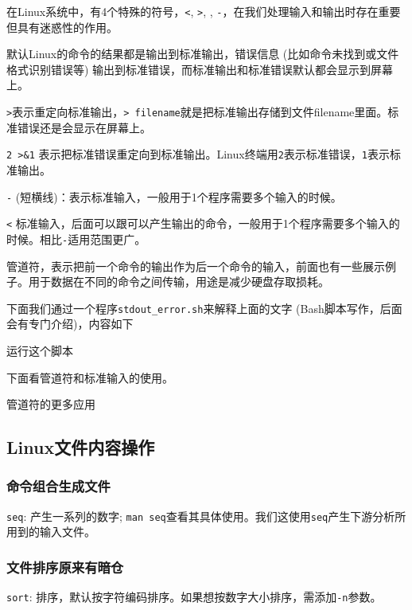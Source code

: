 \documentclass[]{article}
\numberwithin{figure}{section}
\numberwithin{table}{section}
\begin{document}
在Linux系统中，有4个特殊的符号，\texttt{\textless{}}, \texttt{\textgreater{}}, \texttt{\textbar{}}, \texttt{-}，在我们处理输入和输出时存在重要但具有迷惑性的作用。

默认Linux的命令的结果都是输出到标准输出，错误信息 (比如命令未找到或文件格式识别错误等) 输出到标准错误，而标准输出和标准错误默认都会显示到屏幕上。

\texttt{\textgreater{}}表示重定向标准输出，\texttt{\textgreater{}\ filename}就是把标准输出存储到文件filename里面。标准错误还是会显示在屏幕上。

\texttt{2\ \textgreater{}\&1} 表示把标准错误重定向到标准输出。Linux终端用\texttt{2}表示标准错误，\texttt{1}表示标准输出。

\texttt{-} (短横线)：表示标准输入，一般用于1个程序需要多个输入的时候。

\texttt{\textless{}} 标准输入，后面可以跟可以产生输出的命令，一般用于1个程序需要多个输入的时候。相比\texttt{-}适用范围更广。

\texttt{\textbar{}}管道符，表示把前一个命令的输出作为后一个命令的输入，前面也有一些展示例子。用于数据在不同的命令之间传输，用途是减少硬盘存取损耗。

下面我们通过一个程序\texttt{stdout\_error.sh}来解释上面的文字 (Bash脚本写作，后面会有专门介绍)，内容如下

运行这个脚本

下面看管道符和标准输入的使用。

管道符的更多应用

\hypertarget{filecontent}{%
\subsection{Linux文件内容操作}\label{filecontent}}

\hypertarget{generate_file_seq}{%
\subsubsection{命令组合生成文件}\label{generate_file_seq}}

\texttt{seq}: 产生一系列的数字; \texttt{man\ seq}查看其具体使用。我们这使用\texttt{seq}产生下游分析所用到的输入文件。

\hypertarget{sort_par}{%
\subsubsection{文件排序原来有暗仓}\label{sort_par}}

\texttt{sort}: 排序，默认按字符编码排序。如果想按数字大小排序，需添加\texttt{-n}参数。
\end{document}
